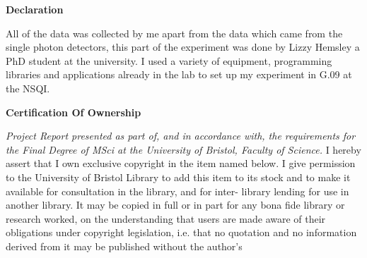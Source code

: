 \documentclass[11pt]{article}
\numberwithin{equation}{section}
\numberwithin{figure}{section}
\begin{document}
\begin{abstract}
The joint spectral intensities of silicon ring resonators are measured using stimulated four wave mixing, allowing the visualisation and analysis of the spectral entanglement between generated photon pairs to high resolution. For an amorphous silicon ring resonator joint spectral intensities and the $g^{(2)}(0)$ are measured for varying powers of a pulsed laser, allowing for a comparison of the two methods, showing the expected agreement. A method to quantify the uncertainty in the purities calculated is also developed, paving the way for more advanced measurements.
\end{abstract}
\newpage
\renewcommand{\abstractname}{Acknowledgements}
\newpage
\begin{abstract}
Thank you Damien and Josh for your invaluable help throughout my project. Lizzy for working with me in the lab and many helpful discussions. Imad for your help and encouragement. Mark for giving me the opportunity and supervision. Raf for your help and Phil for getting many catchy songs stuck in my head.
\end{abstract}

\begin{center}
{\bf Declaration }
\end{center}
All of the data was collected by me apart from the data which came from the single photon detectors, this part of the experiment was done by Lizzy Hemsley a PhD student at the university. I used a variety of equipment, programming libraries and applications already in the lab to set up my experiment in G.09 at the NSQI.
\newline\newline
\begin{center}
{\bf Certification Of Ownership }
\end{center}
\textit{Project Report presented as part of, and in accordance with, the requirements for the Final Degree of
MSci at the University of Bristol, Faculty of Science.}\newline
I hereby assert that I own exclusive copyright in the item named below. I give permission to the University of
Bristol Library to add this item to its stock and to make it available for consultation in the library, and for inter-
library lending for use in another library. It may be copied in full or in part for any bona fide library or research
worked, on the understanding that users are made aware of their obligations under copyright legislation, i.e. that
no quotation and no information derived from it may be published without the author’s 
\end{document}
